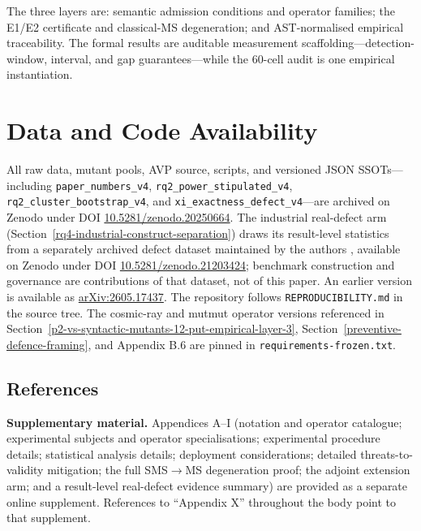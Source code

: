 \documentclass[review,12pt,authoryear]{elsarticle}
\begin{document}
The three layers are: semantic admission conditions and operator
families; the E1/E2 certificate and classical-MS degeneration; and
AST-normalised empirical traceability. The formal results are auditable
measurement scaffolding---detection-window, interval, and gap
guarantees---while the 60-cell audit is one empirical instantiation.

\section*{Data and Code Availability}\label{data-and-code-availability}

All raw data, mutant pools, AVP source, scripts, and versioned JSON
SSOTs---including \texttt{paper\_numbers\_v4},
\texttt{rq2\_power\_stipulated\_v4},
\texttt{rq2\_cluster\_bootstrap\_v4}, and
\texttt{xi\_exactness\_defect\_v4}---are archived on Zenodo under DOI
\href{https://doi.org/10.5281/zenodo.20250664}{10.5281/zenodo.20250664}.
The industrial real-defect arm (Section~\ref{rq4-industrial-construct-separation}) draws its result-level
statistics from a separately archived defect dataset maintained by the
authors \citep{defect4mr2026}, available on Zenodo under DOI
\href{https://doi.org/10.5281/zenodo.21203424}{10.5281/zenodo.21203424};
benchmark construction and governance are contributions of that dataset,
not of this paper.
An earlier version is available as
\href{https://arxiv.org/abs/2605.17437}{arXiv:2605.17437}. The repository follows
\texttt{REPRODUCIBILITY.md} in the source tree. The cosmic-ray and
mutmut operator versions referenced in Section~\ref{p2-vs-syntactic-mutants-12-put-empirical-layer-3}, Section~\ref{preventive-defence-framing}, and Appendix B.6 are
pinned in \texttt{requirements-frozen.txt}.


\subsection{References}\label{references}




\clearpage

\textbf{Supplementary material.} Appendices A--I (notation and operator
catalogue; experimental subjects and operator specialisations; experimental
procedure details; statistical analysis details; deployment considerations;
detailed threats-to-validity mitigation; the full SMS$\to$MS degeneration
proof; the adjoint extension arm; and a result-level real-defect evidence
summary) are provided as a separate online
supplement. References to ``Appendix X'' throughout the body point to that
supplement.
\end{document}
